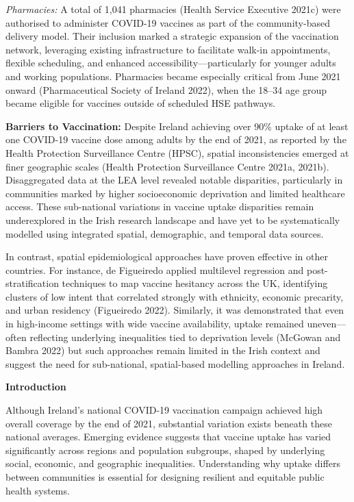\documentclass{article}
\begin{document}
\emph{Pharmacies:} A total of 1,041 pharmacies (Health Service Executive
2021c) were authorised to administer COVID-19 vaccines as part of the
community-based delivery model. Their inclusion marked a strategic
expansion of the vaccination network, leveraging existing infrastructure
to facilitate walk-in appointments, flexible scheduling, and enhanced
accessibility---particularly for younger adults and working populations.
Pharmacies became especially critical from June 2021 onward
(Pharmaceutical Society of Ireland 2022), when the 18--34 age group
became eligible for vaccines outside of scheduled HSE pathways.

\textbf{Barriers to Vaccination:} Despite Ireland achieving over 90\%
uptake of at least one COVID-19 vaccine dose among adults by the end of
2021, as reported by the Health Protection Surveillance Centre (HPSC),
spatial inconsistencies emerged at finer geographic scales (Health
Protection Surveillance Centre 2021a, 2021b). Disaggregated data at the
LEA level revealed notable disparities, particularly in communities
marked by higher socioeconomic deprivation and limited healthcare
access. These sub-national variations in vaccine uptake disparities
remain underexplored in the Irish research landscape and have yet to be
systematically modelled using integrated spatial, demographic, and
temporal data sources.

In contrast, spatial epidemiological approaches have proven effective in
other countries. For instance, de Figueiredo applied multilevel
regression and post-stratification techniques to map vaccine hesitancy
across the UK, identifying clusters of low intent that correlated
strongly with ethnicity, economic precarity, and urban residency
(Figueiredo 2022). Similarly, it was demonstrated that even in
high-income settings with wide vaccine availability, uptake remained
uneven---often reflecting underlying inequalities tied to deprivation
levels (McGowan and Bambra 2022) but such approaches remain limited in
the Irish context and suggest the need for sub-national, spatial-based
modelling approaches in Ireland.

\textbf{Introduction}

Although Ireland's national COVID-19 vaccination campaign achieved high
overall coverage by the end of 2021, substantial variation exists
beneath these national averages. Emerging evidence suggests that vaccine
uptake has varied significantly across regions and population subgroups,
shaped by underlying social, economic, and geographic inequalities.
Understanding why uptake differs between communities is essential for
designing resilient and equitable public health systems.
\end{document}
